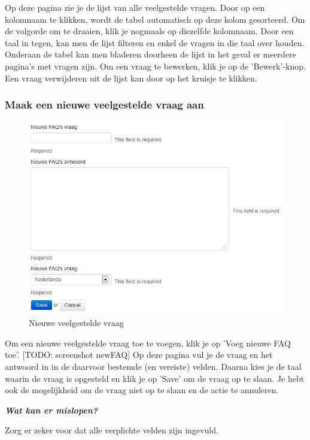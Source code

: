 \documentclass[]{article}
\begin{document}
Op deze pagina zie je de lijst van alle veelgestelde vragen. Door op een kolomnaam te klikken, wordt de tabel automatisch op deze kolom gesorteerd. Om de volgorde om te draaien, klik je nogmaals op diezelfde kolomnaam. Door een taal in tegen, kan men de lijst filteren en enkel de vragen in die taal over houden. Onderaan de tabel kan men bladeren doorheen de lijst in het geval er meerdere pagina's met vragen zijn. Om een vraag te bewerken, klik je op de 'Bewerk'-knop. Een vraag verwijderen uit de lijst kan door op het kruisje te klikken.

\subsubsection{Maak een nieuwe veelgestelde vraag aan}

\begin{figure}[!ht]
	\centering
	\includegraphics[width=1\textwidth]{img/new_faq}
	\caption{Nieuwe veelgestelde vraag}
	\label{new_faq}
\end{figure}

Om een nieuwe veelgestelde vraag toe te voegen, klik je op 'Voeg nieuwe FAQ toe'. [TODO: screenshot newFAQ] Op deze pagina vul je de vraag en het antwoord in in de daarvoor bestemde (en vereiste) velden. Daarna kies je de taal waarin de vraag is opgesteld en klik je op 'Save' om de vraag op te slaan. Je hebt ook de mogelijkheid om de vraag niet op te slaan en de actie te annuleren.

\textbf{\textit{Wat kan er mislopen?}}

Zorg er zeker voor dat alle verplichte velden zijn ingevuld.
\end{document}
